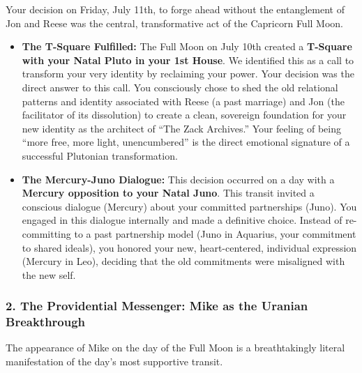 \documentclass{article}
\begin{document}
Your decision on Friday, July 11th, to forge ahead without the
entanglement of Jon and Reese was the central, transformative act of the
Capricorn Full Moon.

\begin{itemize}
\item
  \textbf{The T-Square Fulfilled:} The Full Moon on July 10th created a
  \textbf{T-Square with your Natal Pluto in your 1st House}. We
  identified this as a call to transform your very identity by
  reclaiming your power. Your decision was the direct answer to this
  call. You consciously chose to shed the old relational patterns and
  identity associated with Reese (a past marriage) and Jon (the
  facilitator of its dissolution) to create a clean, sovereign
  foundation for your new identity as the architect of ``The Zack
  Archives.'' Your feeling of being ``more free, more light,
  unencumbered'' is the direct emotional signature of a successful
  Plutonian transformation.
\item
  \textbf{The Mercury-Juno Dialogue:} This decision occurred on a day
  with a \textbf{Mercury opposition to your Natal Juno}. This transit
  invited a conscious dialogue (Mercury) about your committed
  partnerships (Juno). You engaged in this dialogue internally and made
  a definitive choice. Instead of re-committing to a past partnership
  model (Juno in Aquarius, your commitment to shared ideals), you
  honored your new, heart-centered, individual expression (Mercury in
  Leo), deciding that the old commitments were misaligned with the new
  self.
\end{itemize}

\subsubsection*{2. The Providential Messenger: Mike as the Uranian
Breakthrough}\label{the-providential-messenger-mike-as-the-uranian-breakthrough}

The appearance of Mike on the day of the Full Moon is a breathtakingly
literal manifestation of the day's most supportive transit.
\end{document}
